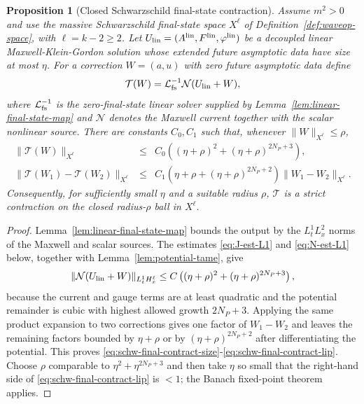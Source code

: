\documentclass[11pt]{article}
\numberwithin{equation}{section}
\theoremstyle{plain}
\newtheorem{proposition}[theorem]{Proposition}
\theoremstyle{definition}
\theoremstyle{remark}
\begin{document}
\begin{proposition}[Closed Schwarzschild final-state contraction]\label{prop:schwarzschild-closed-finalstate-contraction}
Assume $m^2>0$ and use the massive Schwarzschild final-state space $X^\ell$ of Definition~\ref{def:waveop-space}, with $\ell=k-2\ge2$.  Let $U_{\rm lin}=(A^{\rm lin},F^{\rm lin},\varphi^{\rm lin})$ be a decoupled linear Maxwell-Klein-Gordon solution whose extended future asymptotic data have size at most $\eta$.  For a correction $W=(a,u)$ with zero future asymptotic data define
\begin{equation}
 \mathcal T(W)=\mathcal L_{\rm fs}^{-1}\mathcal N(U_{\rm lin}+W),
\end{equation}
where $\mathcal L_{\rm fs}^{-1}$ is the zero-final-state linear solver supplied by Lemma~\ref{lem:linear-final-state-map} and $\mathcal N$ denotes the Maxwell current together with the scalar nonlinear source.  There are constants $C_0,C_1$ such that, whenever $\|W\|_{X^\ell}\le\rho$,
\begin{eqnarray}
 \|\mathcal T(W)\|_{X^\ell}
 &\le& C_0\left((\eta+\rho)^2+(\eta+\rho)^{2N_P+3}\right),\label{eq:schw-final-contract-size}\\
 \|\mathcal T(W_1)-\mathcal T(W_2)\|_{X^\ell}
 &\le& C_1\left(\eta+\rho+(\eta+\rho)^{2N_P+2}\right)
 \|W_1-W_2\|_{X^\ell}.
 \label{eq:schw-final-contract-lip}
\end{eqnarray}
Consequently, for sufficiently small $\eta$ and a suitable radius $\rho$, $\mathcal T$ is a strict contraction on the closed radius-$\rho$ ball in $X^\ell$.
\end{proposition}

\begin{proof}
Lemma~\ref{lem:linear-final-state-map} bounds the output by the $L^1_tL^2_x$ norms of the Maxwell and scalar sources.  The estimates \eqref{eq:J-est-L1} and \eqref{eq:N-est-L1} below, together with Lemma~\ref{lem:potential-tame}, give
\begin{equation}
 \|\mathcal N(U_{\rm lin}+W)\|_{L^1_tH^\ell_x}
 \le C\left((\eta+\rho)^2+(\eta+\rho)^{2N_P+3}\right),
\end{equation}
because the current and gauge terms are at least quadratic and the potential remainder is cubic with highest allowed growth $2N_P+3$.  Applying the same product expansion to two corrections gives one factor of $W_1-W_2$ and leaves the remaining factors bounded by $\eta+\rho$ or by $(\eta+\rho)^{2N_P+2}$ after differentiating the potential.  This proves \eqref{eq:schw-final-contract-size}-\eqref{eq:schw-final-contract-lip}.  Choose $\rho$ comparable to $\eta^2+\eta^{2N_P+3}$ and then take $\eta$ so small that the right-hand side of \eqref{eq:schw-final-contract-lip} is $<1$; the Banach fixed-point theorem applies.
\end{proof}
\end{document}
